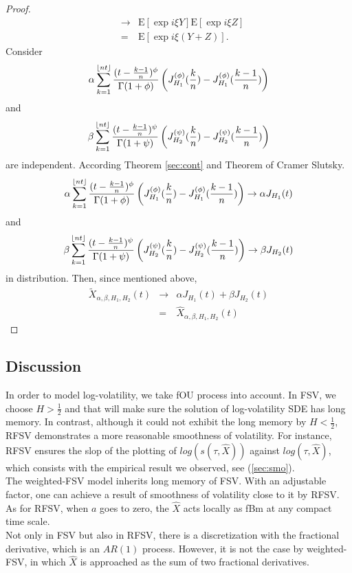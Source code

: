 \documentclass[a4paper, twoside, 11pt]{article}
\theoremstyle{definition}
\DeclarePairedDelimiter\floor{\lfloor}{\rfloor}
\newcommand{\brkt}[1]{\left({#1} \right)}
\begin{document}
\begin{proof}
\begin{eqnarray*}
  &\rightarrow& \mathrm{E}[\exp{i\xi Y}] \mathrm{E}[\exp{i\xi Z}]\\
  &=& \mathrm{E}[\exp{i\xi (Y+Z)}].
\end{eqnarray*}
Consider 
$$
\alpha\sum_{k=1}^{\floor{nt}} \frac{(t - \frac{k-1}{n})^\phi}{\Gamma(1+\phi)} \brkt{J_{H_1}^{(\phi)}(\frac{k}{n}) - J_{H_1}^{(\phi)}(\frac{k-1}{n})}$$
and 
$$\beta\sum_{k=1}^{\floor{nt}} \frac{(t - \frac{k-1}{n})^\psi}{\Gamma(1+\psi)} \brkt{J_{H_2}^{(\psi)}(\frac{k}{n}) - J_{H_2}^{(\psi)}(\frac{k-1}{n})}
$$
are independent. According Theorem \ref{sec:cont} and Theorem of Cramer Slutsky. 
$$
\alpha\sum_{k=1}^{\floor{nt}} \frac{(t - \frac{k-1}{n})^\phi}{\Gamma(1+\phi)} \brkt{J_{H_1}^{(\phi)}(\frac{k}{n}) - J_{H_1}^{(\phi)}(\frac{k-1}{n})} \rightarrow \alpha J_{H_1}(t)
$$ and
$$
\beta\sum_{k=1}^{\floor{nt}} \frac{(t - \frac{k-1}{n})^\psi}{\Gamma(1+\psi)} \brkt{J_{H_2}^{(\psi)}(\frac{k}{n}) - J_{H_2}^{(\psi)}(\frac{k-1}{n})} \rightarrow \beta J_{H_2}(t)
$$ in distribution.
Then, since mentioned above,
\begin{eqnarray*}
  \tilde{X}_{\alpha,\beta,H_1,H_2}(t) &\rightarrow& \alpha J_{H_1}(t) + \beta J_{H_2}(t)\\
  &=& \hat{X}_{\alpha,\beta,H_1,H_2}(t)
\end{eqnarray*}
	\end{proof}
	\subsection{Discussion}
   In order to model log-volatility, we take fOU process into account. In FSV, we choose $H > \frac{1}{2}$ and that will make sure the solution of log-volatility SDE has long memory. In contrast, although it could not exhibit the long memory by $H < \frac{1}{2}$, RFSV demonstrates a more reasonable smoothness of volatility. For instance, RFSV ensures  the slop of the plotting of $log(s(\tau, \hat{X}))$ against $log(\tau, \hat{X})$, which consists with the empirical result we observed, see (\ref{sec:smo}).\\
	The weighted-FSV model inherits long memory of FSV. With an adjustable factor, one can achieve a result of smoothness of volatility close to it by RFSV. As for RFSV, when $a$ goes to zero, the $\hat{X}$ acts locally as fBm at any compact time scale.\\
	Not only in FSV but also in RFSV, there is a discretization with the fractional derivative, which is an $AR(1)$ process. However, it is not the case by weighted-FSV, in which $\hat{X}$ is approached as the sum of two fractional derivatives.
\end{document}
